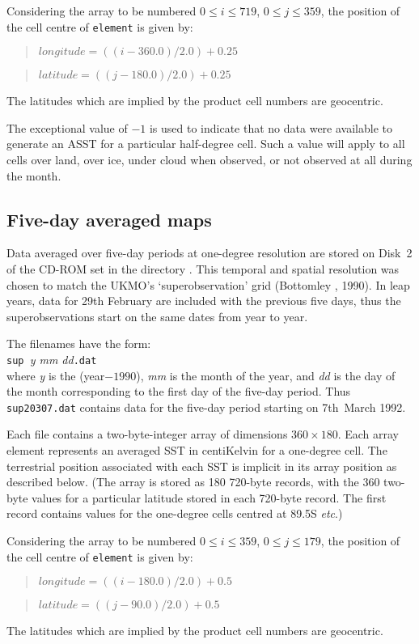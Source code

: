 Considering the array to be numbered $0\le i \le 719$, $0 \le j \le 359$,
the position of the cell centre of {\tt element} is given by:
\begin{quote} $longitude = ((i - 360.0) / 2.0) + 0.25$
\end{quote} 
\begin{quote} $latitude = ((j - 180.0) / 2.0) + 0.25$
\end{quote} 
The latitudes which are implied by the product cell numbers are
geocentric.

The exceptional value of $-1$ is used to indicate that no data were 
available to generate an ASST for a particular half-degree cell.
Such a value will apply to all cells over land, over ice, under cloud
when observed, or not observed at all during the month.


\subsection{Five-day averaged maps}
\label{subsec:super}

Data averaged over five-day periods at one-degree resolution are
stored on Disk~2 of the CD-ROM set in the directory
.
This temporal and spatial resolution was chosen to match the UKMO's 
`superobservation' grid  (Bottomley \etal, 1990).
In leap years, data for 29th February are included with the previous 
five days, thus the superobservations start on the same dates from year to 
year.

The filenames have the form:\\
\hspace*{2cm} {\tt sup }{\sl y mm dd}{\tt.dat}\\
where {\sl y} is the (year$-1990$), {\sl mm} is the month of the year,
and {\sl dd} is the day of the month corresponding to the first day of the
five-day period.
Thus {\tt sup20307.dat} contains data for the five-day period 
starting on 7th~March 1992.


Each file contains a two-byte-integer array of dimensions $360\times180$.
Each array element represents an averaged  SST  in centiKelvin for a 
one-degree cell.
The terrestrial position associated with each SST is implicit in its 
array position as described below.
(The array is stored as 180 720-byte records, with the 360 two-byte values
for a particular latitude stored in each 720-byte record. 
The first record contains values for the  one-degree cells
centred at 89.5{\degree}S {\sl etc}.)

Considering the array to be numbered $0\le i \le 359$, $0 \le j \le 179$,
the position of the cell centre of {\tt element} is given by:
\begin{quote} $longitude = ((i - 180.0) / 2.0) + 0.5$
\end{quote} 
\begin{quote} $latitude = ((j - 90.0) / 2.0) + 0.5$
\end{quote} 
The latitudes which are implied by the product cell numbers are
geocentric.


